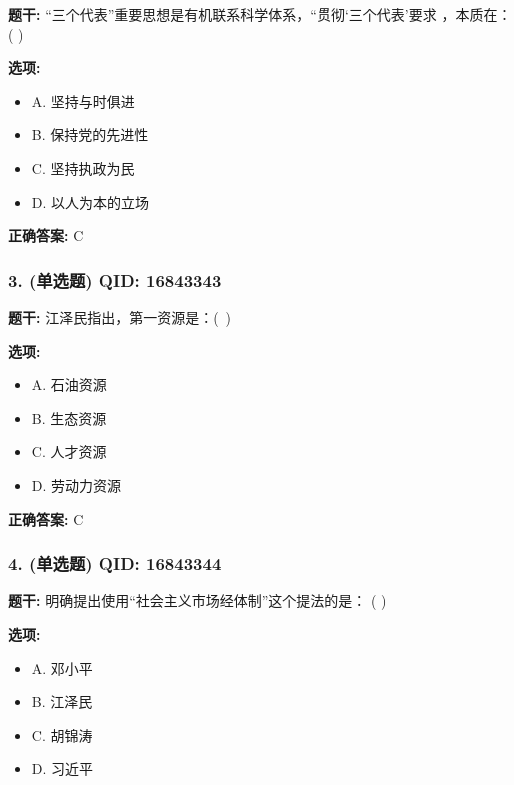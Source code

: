 \documentclass[12pt,UTF8]{ctexart}
\begin{document}
\textbf{题干:}
“三个代表”重要思想是有机联系科学体系，“贯彻‘三个代表’要求 ，本质在：( )

\textbf{选项:}
\begin{itemize}[leftmargin=*]

  \item A. 坚持与时俱进

  \item B. 保持党的先进性

  \item C. 坚持执政为民

  \item D. 以人为本的立场

\end{itemize}

\textbf{正确答案:}
C

\vspace{0.3em}\hrulefill\vspace{0.7em}

\subsubsection*{3. (单选题) \small QID: 16843343}

\textbf{题干:}
江泽民指出，第一资源是：( )

\textbf{选项:}
\begin{itemize}[leftmargin=*]

  \item A. 石油资源

  \item B. 生态资源

  \item C. 人才资源

  \item D. 劳动力资源

\end{itemize}

\textbf{正确答案:}
C

\vspace{0.3em}\hrulefill\vspace{0.7em}

\subsubsection*{4. (单选题) \small QID: 16843344}

\textbf{题干:}
明确提出使用“社会主义市场经体制”这个提法的是： ( )

\textbf{选项:}
\begin{itemize}[leftmargin=*]

  \item A. 邓小平

  \item B. 江泽民

  \item C. 胡锦涛

  \item D. 习近平

\end{itemize}
\end{document}
